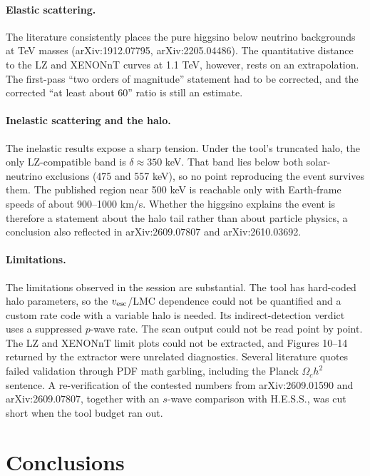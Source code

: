 \documentclass[11pt,a4paper]{article}
\begin{document}
\paragraph{Elastic scattering.} The literature consistently places the pure higgsino below neutrino backgrounds at TeV masses (arXiv:1912.07795, arXiv:2205.04486). The quantitative distance to the LZ and XENONnT curves at 1.1 TeV, however, rests on an extrapolation. The first-pass ``two orders of magnitude'' statement had to be corrected, and the corrected ``at least about 60'' ratio is still an estimate.

\paragraph{Inelastic scattering and the halo.} The inelastic results expose a sharp tension. Under the tool's truncated halo, the only LZ-compatible band is $\delta\approx350$ keV. That band lies below both solar-neutrino exclusions (475 and 557 keV), so no point reproducing the event survives them. The published region near 500 keV is reachable only with Earth-frame speeds of about 900--1000 km/s. Whether the higgsino explains the event is therefore a statement about the halo tail rather than about particle physics, a conclusion also reflected in arXiv:2609.07807 and arXiv:2610.03692.

\paragraph{Limitations.} The limitations observed in the session are substantial. The tool has hard-coded halo parameters, so the $v_{\rm esc}$/LMC dependence could not be quantified and a custom rate code with a variable halo is needed. Its indirect-detection verdict uses a suppressed $p$-wave rate. The scan output could not be read point by point. The LZ and XENONnT limit plots could not be extracted, and Figures 10--14 returned by the extractor were unrelated diagnostics. Several literature quotes failed validation through PDF math garbling, including the Planck $\Omega_ch^2$ sentence. A re-verification of the contested numbers from arXiv:2609.01590 and arXiv:2609.07807, together with an $s$-wave comparison with H.E.S.S., was cut short when the tool budget ran out.

\section{Conclusions}
\end{document}
